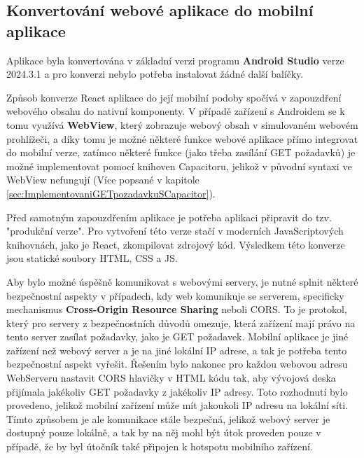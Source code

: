 \subsection{Konvertování webové aplikace do mobilní aplikace}\label{sec:KonvertovaniWeboveAplikaceDoMobilni}

Aplikace byla konvertována v základní verzi programu \textbf{Android Studio} verze 2024.3.1 a pro konverzi nebylo potřeba instalovat žádné další balíčky.

Způsob konverze React aplikace do její mobilní podoby spočívá v zapouzdření webového obsahu do nativní komponenty. V případě zařízení s Androidem se k tomu využívá \textbf{WebView}, který zobrazuje webový obsah v simulovaném webovém prohlížeči, a díky tomu je možné některé funkce webové aplikace přímo integrovat do mobilní verze, zatímco některé funkce (jako třeba zasílání GET požadavků) je možné implementovat pomocí knihoven Capacitoru, jelikož v původní syntaxi ve WebView nefungují (Více popsané v kapitole \ref{sec:ImplementovaniGETpozadavkuSCapacitor}).
\cite{CapacitorHowItWorks}

Před samotným zapouzdřením aplikace je potřeba aplikaci připravit do tzv. "produkční verze". Pro vytvoření této verze stačí v moderních JavaScriptových knihovnách, jako je React, zkompilovat zdrojový kód. Výsledkem této konverze jsou statické soubory HTML, CSS a JS.

Aby bylo možné úspěšně komunikovat s webovými servery, je nutné splnit některé bezpečnostní aspekty v případech, kdy web komunikuje se serverem, specificky mechanismus \textbf{Cross-Origin Resource Sharing} neboli CORS. To je protokol, který pro servery z bezpečnostních důvodů omezuje, která zařízení mají právo na tento server zasílat požadavky, jako je GET požadavek. Mobilní aplikace je jiné zařízení než webový server a je na jiné lokální IP adrese, a tak je potřeba tento bezpečnostní aspekt vyřešit. Řešením bylo nakonec pro každou webovou adresu WebServeru nastavit CORS hlavičky v HTML kódu tak, aby vývojová deska přijímala jakékoliv GET požadavky z jakékoliv IP adresy. Toto rozhodnutí bylo provedeno, jelikož mobilní zařízení může mít jakoukoli IP adresu na lokální síti. Tímto způsobem je ale komunikace stále bezpečná, jelikož webový server je dostupný pouze lokálně, a tak by na něj mohl být útok proveden pouze v případě, že by byl útočník také připojen k hotspotu mobilního zařízení.
\cite{CORShowItWorks}

